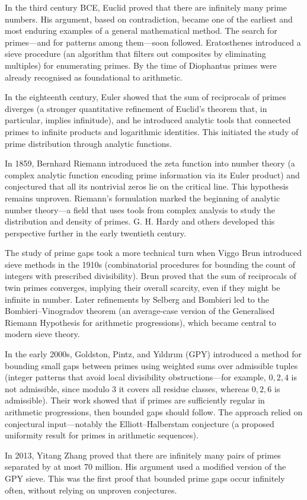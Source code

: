 \begin{historical}
In the third century BCE, Euclid proved that there are infinitely many prime numbers. His argument, based on contradiction, became one of the earliest and most enduring examples of a general mathematical method. The search for primes—and for patterns among them—soon followed. Eratosthenes introduced a sieve procedure (an algorithm that filters out composites by eliminating multiples) for enumerating primes. By the time of Diophantus primes were already recognised as foundational to arithmetic.

In the eighteenth century, Euler showed that the sum of reciprocals of primes diverges (a stronger quantitative refinement of Euclid’s theorem that, in particular, implies infinitude), and he introduced analytic tools that connected primes to infinite products and logarithmic identities. This initiated the study of prime distribution through analytic functions.

In 1859, Bernhard Riemann introduced the zeta function into number theory (a complex analytic function encoding prime information via its Euler product) and conjectured that all its nontrivial zeros lie on the critical line. This hypothesis remains unproven. Riemann’s formulation marked the beginning of analytic number theory—a field that uses tools from complex analysis to study the distribution and density of primes. G. H. Hardy and others developed this perspective further in the early twentieth century.

The study of prime gaps took a more technical turn when Viggo Brun introduced sieve methods in the 1910s (combinatorial procedures for bounding the count of integers with prescribed divisibility). Brun proved that the sum of reciprocals of twin primes converges, implying their overall scarcity, even if they might be infinite in number. Later refinements by Selberg and Bombieri led to the Bombieri–Vinogradov theorem (an average-case version of the Generalised Riemann Hypothesis for arithmetic progressions), which became central to modern sieve theory.

In the early 2000s, Goldston, Pintz, and Yıldırım (GPY) introduced a method for bounding small gaps between primes using weighted sums over admissible tuples (integer patterns that avoid local divisibility obstructions—for example, ${0, 2, 4}$ is not admissible, since modulo 3 it covers all residue classes, whereas ${0, 2, 6}$ is admissible). Their work showed that if primes are sufficiently regular in arithmetic progressions, then bounded gaps should follow. The approach relied on conjectural input—notably the Elliott–Halberstam conjecture (a proposed uniformity result for primes in arithmetic sequences).

In 2013, Yitang Zhang proved that there are infinitely many pairs of primes separated by at most 70 million. His argument used a modified version of the GPY sieve. This was the first proof that bounded prime gaps occur infinitely often, without relying on unproven conjectures.
\end{historical}
